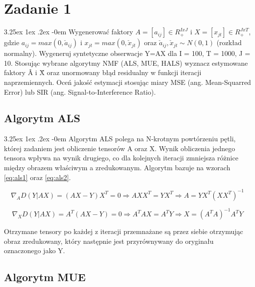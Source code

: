 \documentclass[11pt, a4paper]{article}
\date{\today}
\makeatletter
\newcommand{\fbi}{\leavevmode{\parindent=1em\indent}}
\renewcommand\paragraph{\@startsection{paragraph}{5}{\z@}
  {3.25ex \@plus1ex \@minus.2ex}
  {-0em}
  {\normalfont\normalsize\bfseries}}
\makeatother
\begin{document}


\tableofcontents

\newpage
\section{Zadanie 1}
\paragraph{}
Wygenerować faktory $A = [a_{ij}] \in R^{I x J}_{+}$ i $X = [x_{jt}] \in R^{J x T}_{+}$, gdzie $a_{ij} = max(0,\check{a}_{ij})$ i $x_{jt} = max(0,\check{x}_{jt})$ oraz $\check{a}_{ij},\check{x}_{jt}\sim N(0,1)$ (rozkład normalny). Wygeneruj syntetyczne obserwacje Y=AX dla I = 100, T = 1000, J = 10. Stosując wybrane algorytmy NMF (ALS, MUE, HALS) wyznacz estymowane faktory \^{A} i \^{X} oraz unormowany błąd residualny w funkcji iteracji naprzemiennych. Oceń jakość estymacji stosując miary MSE (ang. Mean-Squarred Error) lub SIR (ang. Signal-to-Interference Ratio).

\subsection{Algorytm ALS}
\paragraph{}
Algorytm ALS polega na N-krotnym powtórzeniu pętli, której zadaniem jest obliczenie tensorów A oraz X.
Wynik obliczenia jednego tensora wpływa na wynik drugiego, co dla kolejnych iteracji zmniejsza różnice między obrazem właściwym a zredukowanym. Algorytm bazuje na wzorach \ref{eq:als1} oraz \ref{eq:als2}.	

\begin{equation}\label{eq:als1}
\nabla_A D(Y|AX) = (AX - Y)X^T = 0 \Rightarrow AXX^T = YX^T \Rightarrow A = YX^T(XX^T)^{-1}
\end{equation}

\begin{equation}\label{eq:als2}
\nabla_X D(Y|AX) = A^T(AX - Y) = 0 \Rightarrow A^TAX = A^TY \Rightarrow X = (A^TA)^{-1}A^TY
\end{equation}

\fbi
Otrzymane tensory po każdej z iteracji przemnażane są przez siebie otrzymując obraz zredukowany, który następnie jest przyrównywany do oryginału oznaczonego jako Y.

\subsection{Algorytm MUE}
\end{document}
